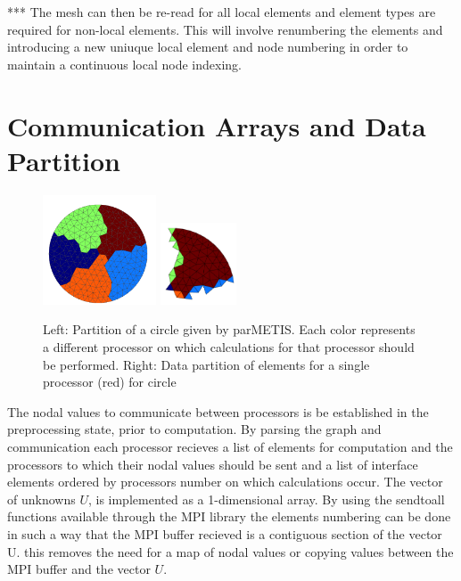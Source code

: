 *** The mesh can then be re-read for all local elements and element types are required for non-local elements. This will involve renumbering the elements and introducing a new uniuque local element and node numbering in order to maintain a continuous local node indexing.


\section{Communication Arrays and Data Partition}

\begin{figure}[htbp!]
 \centering
 \includegraphics[width=0.3\textwidth]{Figures/Chapters/Parallelisation/parmetisPartition}
 \includegraphics[width=0.2\textwidth]{Figures/Chapters/Parallelisation/parmetisDataPartition}
\caption{Left: Partition of a circle given by parMETIS. Each color represents a different processor on which calculations for that processor should be performed. Right: Data partition of elements for a single processor (red) for circle}
\label{parmetis-figure}
\end{figure}

The nodal values to communicate between processors is be established in the preprocessing state, prior to computation. By parsing the graph and communication each processor recieves a list of elements for computation and the processors to which their nodal values should be sent and a list of interface elements ordered by processors number on which calculations occur. The vector of unknowns $U$, is implemented as a 1-dimensional array. By using the sendtoall functions available through the MPI library the elements numbering can be done in such a way that the MPI buffer recieved is a contiguous section of the vector U. this removes the need for a map of nodal values or copying values between the MPI buffer and the vector $U$.

